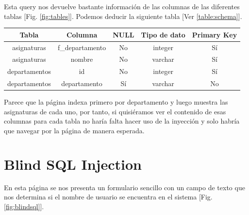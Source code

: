 \documentclass[a4paper,oneside]{article}
\begin{document}
Esta query nos devuelve bastante información de las columnas de las diferentes tablas [Fig. \ref{fig:tables}]. Podemos deducir la siguiente tabla [Ver \ref{table:schema}].

\begin{center}
\label{table:schema}
\begin{tabular}{|c|c|c|c|c|}
\hline 
 \textbf{Tabla} & \textbf{Columna} & \textbf{NULL} & \textbf{Tipo de dato} & \textbf{Primary Key} \\ 
\hline 
 asignaturas & f\_departamento & No & integer & Sí \\ 
\hline 
 asignaturas & nombre & No & varchar & Sí \\ 
\hline 
 departamentos & id & No & integer & Sí \\ 
\hline 
 departamentos & departamento & Sí & varchar & No \\ 
\hline
\end{tabular} 
\end{center}

Parece que la página indexa primero por departamento y luego muestra las asignaturas de cada uno, por tanto, si quisiéramos ver el contenido de esas columnas para cada tabla no haría falta hacer uso de la inyección y solo habría que navegar por la página de manera esperada.

\section{Blind SQL Injection}
En esta página se nos presenta un formulario sencillo con un campo de texto que nos determina si el nombre de usuario se encuentra en el sistema [Fig. \ref{fig:blindsql}].
\end{document}
